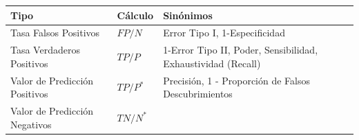 \documentclass[
  12pt,
]{book}
\theoremstyle{definition}
\theoremstyle{definition}
\theoremstyle{definition}
\theoremstyle{remark}
\begin{document}
\begin{longtable}[]{@{}lll@{}}
\toprule
\begin{minipage}[b]{0.19\columnwidth}\raggedright
Tipo\strut
\end{minipage} & \begin{minipage}[b]{0.33\columnwidth}\raggedright
Cálculo\strut
\end{minipage} & \begin{minipage}[b]{0.39\columnwidth}\raggedright
Sinónimos\strut
\end{minipage}\tabularnewline
\midrule
\endhead
\begin{minipage}[t]{0.19\columnwidth}\raggedright
Tasa Falsos Positivos\strut
\end{minipage} & \begin{minipage}[t]{0.33\columnwidth}\raggedright
\(FP/N\)\strut
\end{minipage} & \begin{minipage}[t]{0.39\columnwidth}\raggedright
Error Tipo I, 1-Especificidad\strut
\end{minipage}\tabularnewline
\begin{minipage}[t]{0.19\columnwidth}\raggedright
Tasa Verdaderos Positivos\strut
\end{minipage} & \begin{minipage}[t]{0.33\columnwidth}\raggedright
\(TP/P\)\strut
\end{minipage} & \begin{minipage}[t]{0.39\columnwidth}\raggedright
1-Error Tipo II, Poder, Sensibilidad, Exhaustividad (Recall)\strut
\end{minipage}\tabularnewline
\begin{minipage}[t]{0.19\columnwidth}\raggedright
Valor de Predicción Positivos\strut
\end{minipage} & \begin{minipage}[t]{0.33\columnwidth}\raggedright
\(TP/P^{*}\)\strut
\end{minipage} & \begin{minipage}[t]{0.39\columnwidth}\raggedright
Precisión, 1 - Proporción de Falsos Descubrimientos\strut
\end{minipage}\tabularnewline
\begin{minipage}[t]{0.19\columnwidth}\raggedright
Valor de Predicción Negativos\strut
\end{minipage} & \begin{minipage}[t]{0.33\columnwidth}\raggedright
\(TN/N^{*}\)\strut
\end{minipage} & \begin{minipage}[t]{0.39\columnwidth}\raggedright

\end{minipage}
\end{longtable}
\end{document}
